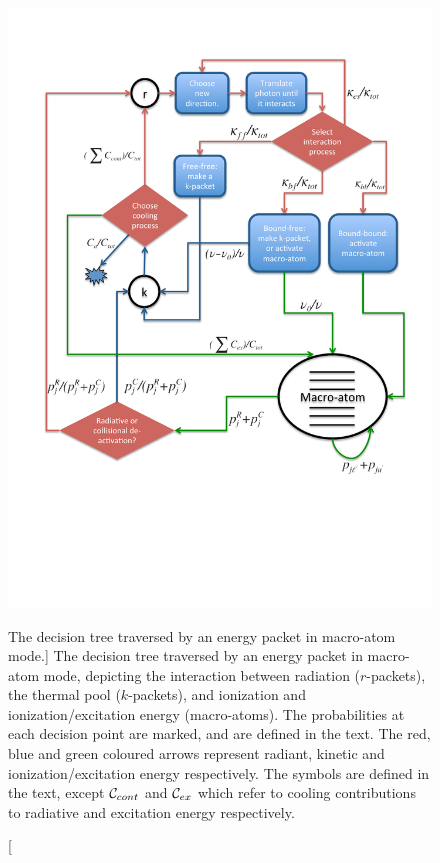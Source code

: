 \begin{figure}
\centering
\includegraphics[width=1.0\textwidth, clip=true, trim=0 2.6in 0in 0in ]{figures/03-radtrans/matom_flow_ca.pdf}
\caption
[The decision tree traversed by an energy packet 
in macro-atom mode.]
{
The decision tree traversed by an energy packet 
in macro-atom mode, depicting the interaction
between radiation ($r$-packets), the thermal pool ($k$-packets), and ionization
and ionization/excitation energy (macro-atoms). 
The probabilities at each decision point are 
marked, and are defined in the text. The red, blue and green coloured arrows
represent radiant, kinetic and ionization/excitation energy respectively.
The symbols are defined in the text, except ${\cal C}_{cont}$ and 
${\cal C}_{ex}$ which refer to cooling contributions to radiative and excitation 
energy respectively.
} 
\label{fig:flow_matom}
\end{figure}


